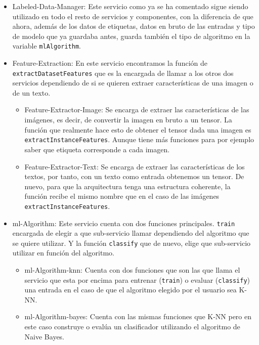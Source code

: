 \documentclass[a4paper, 12pt]{book}
\begin{document}
\begin{itemize}
 
	\item Labeled-Data-Manager: Este servicio como ya se ha comentado sigue siendo utilizado en todo el resto de servicios y componentes, con la diferencia de que ahora, además de los datos de etiquetas, datos en bruto de las entradas y tipo de modelo que ya guardaba antes, guarda también el tipo de algoritmo en la variable \texttt{mlAlgorithm}.
 
	\item Feature-Extraction: En este servicio encontramos la función de \texttt{extractDatasetFeatures} que es la encargada de llamar a los otros dos servicios dependiendo de si se quieren extraer características de una imagen o de un texto.
\begin{itemize}
 
	\item Feature-Extractor-Image: Se encarga de extraer las características de las imágenes, es decir, de convertir la imagen en bruto a un tensor. La función que realmente hace esto de obtener el tensor dada una imagen es \texttt{extractInstanceFeatures}. Aunque tiene más funciones para por ejemplo saber que etiqueta corresponde a cada imagen.

	\item Feature-Extractor-Text: Se encarga de extraer las características de los textos, por tanto, con un texto como entrada obtenemos un tensor. De nuevo, para que la arquitectura tenga una estructura coherente, la función recibe el mismo nombre que en el caso de las imágenes \texttt{extractInstanceFeatures}. 
\end{itemize}

	\item ml-Algorithm: Este servicio cuenta con dos funciones principales. \texttt{train} encargada de elegir a que sub-servicio llamar dependiendo del algoritmo que se quiere utilizar. Y la función \texttt{classify} que de nuevo, elige que sub-servicio utilizar en función del algoritmo.
\begin{itemize}
 
	\item ml-Algorithm-knn: Cuenta con dos funciones que son las que llama el servicio que esta por encima para entrenar (\texttt{train}) o evaluar (\texttt{classify}) una entrada en el caso de que el algoritmo elegido por el usuario sea K-NN.

	\item ml-Algorithm-bayes: Cuenta con las mismas funciones que K-NN pero en este caso construye o evalúa un clasificador utilizando el algoritmo de Naive Bayes.
\end{itemize}


\end{itemize}
\end{document}
